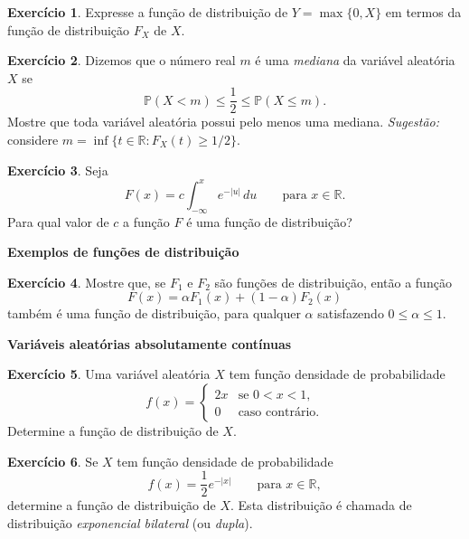 \documentclass[12pt,portuguese]{article}
\theoremstyle{definition}
\theoremstyle{plainexercise}
\newtheorem{exercise}{Exercício}
\theoremstyle{starredexercise}
\theoremstyle{definition}
\begin{document}
\begin{exercise}\label{exercise:fd-maximo-zero}
  Expresse a função de distribuição de $Y = \max\{0, X\}$ em termos da função
  de distribuição $F_X$ de $X$.
\end{exercise}

\begin{exercise}\label{exercise:existencia-mediana}
  Dizemos que o número real $m$ é uma \emph{mediana} da variável aleatória $X$
  se
  \[
    \mathbb{P}(X < m) \leqslant \frac{1}{2} \leqslant \mathbb{P}(X \leqslant m).
  \]
  Mostre que toda variável aleatória possui pelo menos uma mediana.
  \emph{Sugestão:} considere $m=\inf\{t\in\mathbb{R}:F_X(t)\geqslant 1/2\}$.
\end{exercise}

\begin{exercise}\label{exercise:normalizacao-exponencial-modulo}
  Seja
  \[
    F(x) = c \int_{-\infty}^{x} e^{-|u|}\,du \qquad \text{para } x \in
    \mathbb{R}.
  \]
  Para qual valor de $c$ a função $F$ é uma função de distribuição?
\end{exercise}

\medskip
\noindent\textbf{Exemplos de funções de distribuição}

\begin{exercise}\label{exercise:mistura-fd}
  Mostre que, se $F_1$ e $F_2$ são funções de distribuição, então a função
  \[
    F(x) = \alpha F_1(x) + (1 - \alpha) F_2(x)
  \]
  também é uma função de distribuição, para qualquer $\alpha$ satisfazendo $0 \leqslant \alpha \leqslant 1$.
\end{exercise}

\medskip
\noindent\textbf{Variáveis aleatórias absolutamente contínuas}

\begin{exercise}
\label{exercise:densidade-linear-crescente}
  Uma variável aleatória $X$ tem função densidade de probabilidade
  \[
    f(x) = \begin{cases} 2x & \text{se } 0 < x < 1, \\ 0 & \text{caso
      contrário.} \end{cases}
  \]
  Determine a função de distribuição de $X$.
\end{exercise}

\begin{exercise}
\label{exercise:densidade-exponencial-bilateral}
  Se $X$ tem função densidade de probabilidade
  \[
    f(x) = \frac{1}{2}e^{-|x|} \qquad \text{para } x \in \mathbb{R},
  \]
  determine a função de distribuição de $X$. Esta distribuição é chamada
  de distribuição \emph{exponencial bilateral} (ou \emph{dupla}).
\end{exercise}
\end{document}
